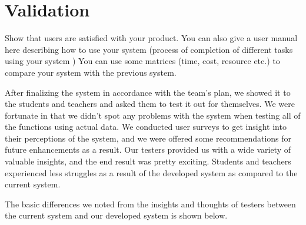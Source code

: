 \section{Validation} \label{sec:val}
Show that users are satisfied with your product. 
You can also give a user manual here describing how to use your system (process of completion of different tasks using your system )
You can use some matrices (time, cost, resource etc.) to compare your system with the previous system.


After finalizing the system in accordance with the team's plan, we showed it to the students and teachers and asked them to test it out for themselves. We were fortunate in that we didn't spot any problems with the system when testing all of the functions using actual data. We conducted user surveys to get insight into their perceptions of the system, and we were offered some recommendations for future enhancements as a result. Our testers provided us with a wide variety of valuable insights, and the end result was pretty exciting. Students and teachers experienced less struggles as a result of the developed system as compared to the current system.

The basic differences we noted from the insights and thoughts of testers between the current system and our developed system is shown below.

